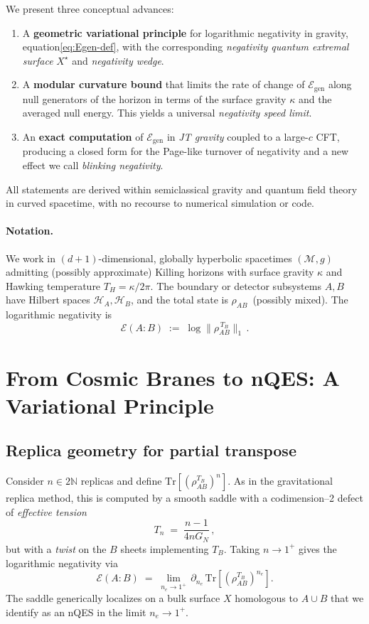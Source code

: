 \documentclass[11pt]{article}
\newcommand{\E}{\mathcal{E}}
\newcommand{\Hil}{\mathcal{H}}
\newcommand{\Tr}{\mathrm{Tr}}
\begin{document}
We present three conceptual advances:
\begin{enumerate}
  \item A \textbf{geometric variational principle} for logarithmic negativity in gravity, equation\~\eqref{eq:Egen-def}, with the corresponding \emph{negativity quantum extremal surface} $X^\star$ and \emph{negativity wedge}.
  \item A \textbf{modular curvature bound} that limits the rate of change of $\E_{\mathrm{gen}}$ along null generators of the horizon in terms of the surface gravity $\kappa$ and the averaged null energy. This yields a universal \emph{negativity speed limit}.
  \item An \textbf{exact computation} of $\E_{\mathrm{gen}}$ in \emph{JT gravity} coupled to a large-$c$ CFT, producing a closed form for the Page-like turnover of negativity and a new effect we call \emph{blinking negativity}.
\end{enumerate}
All statements are derived within semiclassical gravity and quantum field theory in curved spacetime, with no recourse to numerical simulation or code.

\paragraph{Notation.}
We work in $(d{+}1)$-dimensional, globally hyperbolic spacetimes $(\mathcal{M},g)$ admitting (possibly approximate) Killing horizons with surface gravity $\kappa$ and Hawking temperature $T_H=\kappa/2\pi$. The boundary or detector subsystems $A,B$ have Hilbert spaces $\Hil_A,\Hil_B$, and the total state is $\rho_{AB}\,$ (possibly mixed). The logarithmic negativity is
\begin{equation}
  \E(A:B)\;:=\;\log\bigl\|\rho_{AB}^{\,T_B}\bigr\|_1 \,.
\end{equation}

\section{From Cosmic Branes to nQES: A Variational Principle}
\subsection{Replica geometry for partial transpose}
Consider $n\in 2\mathbb{N}$ replicas and define $\Tr\!\left[(\rho_{AB}^{T_B})^{n}\right]$.
As in the gravitational replica method, this is computed by a smooth saddle with a codimension--2 defect of \emph{effective tension}
\begin{equation}
  T_n \;=\; \frac{n-1}{4nG_N}\,,
\end{equation}
but with a \emph{twist} on the $B$ sheets implementing $T_B$. Taking $n\rightarrow 1^+$ gives the logarithmic negativity via
\begin{equation}
  \E(A:B)\;=\;\lim_{n_e\rightarrow 1^+}\,\partial_{n_e}\, \Tr\!\left[(\rho_{AB}^{T_B})^{n_e}\right].
\end{equation}
The saddle generically localizes on a bulk surface $X$ homologous to $A\cup B$ that we identify as an nQES in the limit $n_e\rightarrow 1^+$.
\end{document}
